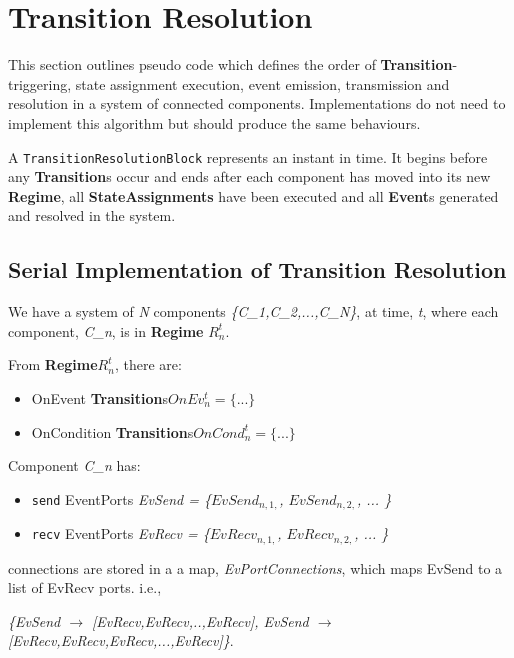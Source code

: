 \documentclass{article}
\newcommand{\EventPort}{{\bf{EventPort}}\xspace}
\newcommand{\Events}{{\bf{Event}}s\xspace}
\newcommand{\Regime}{{\bf{Regime}}\xspace}
\newcommand{\Transition}{{\bf{Transition}}\xspace}
\newcommand{\Transitions}{{\bf{Transition}}s\xspace}
\begin{document}
\section{Transition Resolution}
\label{resolution}

This section outlines pseudo code which defines the order of
\Transition-triggering, state assignment execution, event emission,
transmission and resolution in a system of connected components.
Implementations do not need to implement this algorithm but should produce
the same behaviours.

A {\tt TransitionResolutionBlock} represents an instant in time. It begins
before any \Transitions occur and ends after each component has moved
into its new \Regime, all \textbf{StateAssignments} have been executed
and all \Events generated and resolved in the system.

\subsection{Serial Implementation of Transition Resolution}

\newcommand{\CN}[0]{\textsl{C\_n}}

We have a system of \textsl{N} components \textsl{\{C\_1,C\_2,...,C\_N\}},
at time, \textsl{t}, where each component, \CN, is in \Regime
$R^{t}_{n}$.

\noindent From \Regime $R^{t}_{n}$, there are:
\begin{itemize}
\item OnEvent \Transitions $OnEv^{t}_{n} = \{ ... \}$
\item OnCondition \Transitions $OnCond^{t}_{n} = \{ ... \}$
\end{itemize}

\newcommand{\send}[0]{\texttt{send} }
\newcommand{\recv}[0]{\texttt{recv} }

\noindent Component \CN
has:
\begin{itemize}
\item \send EventPorts \textsl{EvSend = \{$EvSend_{n,1,}$, $EvSend_{n,2,}$, ...  \}}
\item \recv EventPorts \textsl{EvRecv = \{$EvRecv_{n,1,}$, $EvRecv_{n,2,}$, ...  \}}
\end{itemize}

\noindent \EventPort connections are stored in a a map,
\textsl{EvPortConnections}, which maps EvSend to a list of EvRecv ports. i.e.,

\textsl{\{EvSend $\rightarrow$ [EvRecv,EvRecv,..,EvRecv], EvSend $\rightarrow$
[EvRecv,EvRecv,EvRecv,...,EvRecv]\}}.
\end{document}
